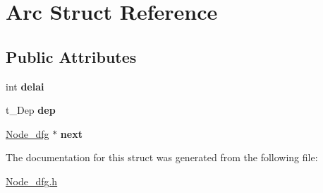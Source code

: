 \hypertarget{structArc}{
\section{Arc Struct Reference}
\label{structArc}
}
\subsection*{Public Attributes}
\begin{DoxyCompactItemize}
\item 
\hypertarget{structArc_a5ded385f25722f3ffe41cdc8adbeedf1}{
int {\bfseries delai}}
\label{structArc_a5ded385f25722f3ffe41cdc8adbeedf1}

\item 
\hypertarget{structArc_a737b68a146ab73723e531bcd99feb9d7}{
t\_\-Dep {\bfseries dep}}
\label{structArc_a737b68a146ab73723e531bcd99feb9d7}

\item 
\hypertarget{structArc_a3dbfe4878415cb35c308e80823b837d3}{
\hyperlink{classNode__dfg}{Node\_\-dfg} $\ast$ {\bfseries next}}
\label{structArc_a3dbfe4878415cb35c308e80823b837d3}

\end{DoxyCompactItemize}


The documentation for this struct was generated from the following file:\begin{DoxyCompactItemize}
\item 
\hyperlink{Node__dfg_8h}{Node\_\-dfg.h}\end{DoxyCompactItemize}
